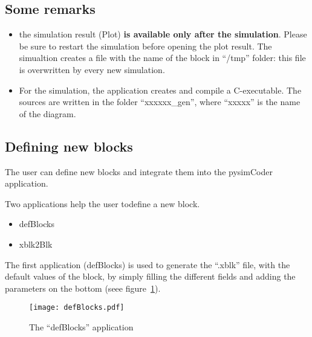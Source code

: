 \subsection{Some remarks}
\begin{itemize}
\item the simulation result (Plot) \textbf{is available only after the 
simulation}. Please be sure to restart the simulation before opening the plot 
result. The simualtion creates a file with the name of the block in ``/tmp'' 
folder: this file is overwritten by every new simulation.
\item For the simulation, the application creates and compile a C-executable. 
The sources are written in the folder ``xxxxxx\_gen'', where ``xxxxx'' is the 
name of the diagram.
\end{itemize}

\subsection{Defining new blocks}
The user can define new blocks and integrate them into the pysimCoder application.

Two applications help the user todefine a new block.

\begin{itemize}
\item defBlocks
\item xblk2Blk
\end{itemize}

The first application (defBlocks) is used to generate the ``.xblk'' file, with the default values of the block, by simply filling the different fields and adding the parameters on the bottom (seee figure~\ref{Fig:defBlocks}).

\begin{figure}[htbp]	%
\centering
\texttt{[image: defBlocks.pdf]}
\caption{The ``defBlocks'' application}
\label{Fig:defBlocks}
\end{figure}

